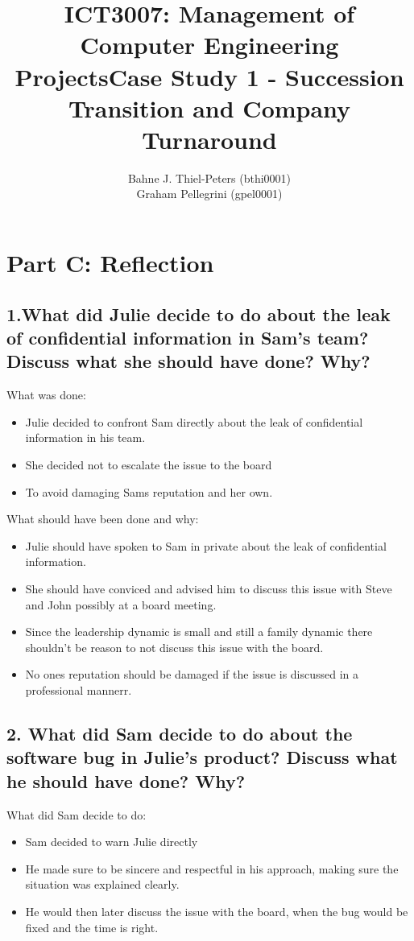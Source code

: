 \documentclass[a4paper,10pt]{article}
\title{ICT3007: Management of Computer Engineering Projects\newline \centering Case Study 1 - Succession Transition and Company Turnaround}
\author{
Bahne J. Thiel-Peters (bthi0001)\\
Graham Pellegrini (gpel0001)
}
\begin{document}
\maketitle
\thispagestyle{empty}

\setcounter{page}{1}

\section{Part C: Reflection}
\subsection{1.What did Julie decide to do about the leak of confidential information in Sam’s team? Discuss what she should have done? Why?}

What was done:
\begin{itemize}
    \item Julie decided to confront Sam directly about the leak of confidential information in his team.
    \item She decided not to escalate the issue to the board
    \item To avoid damaging Sams reputation and her own.
\end{itemize}

What should have been done and why:
\begin{itemize}
    \item Julie should have spoken to Sam in private about the leak of confidential information.
    \item She should have conviced and advised him to discuss this issue with Steve and John possibly at a board meeting.
    \item Since the leadership dynamic is small and still a family dynamic there shouldn't be reason to not discuss this issue with the board. 
    \item No ones reputation should be damaged if the issue is discussed in a professional mannerr.
\end{itemize}

\subsection{2. What did Sam decide to do about the software bug in Julie’s product? Discuss what he should have done? Why?}

What did Sam decide to do:
\begin{itemize}
    \item Sam decided to warn Julie directly
    \item He made sure to be sincere and respectful in his approach, making sure the situation was explained clearly.
    \item He would then later discuss the issue with the board, when the bug would be fixed and the time is right.
\end{itemize}
\end{document}
